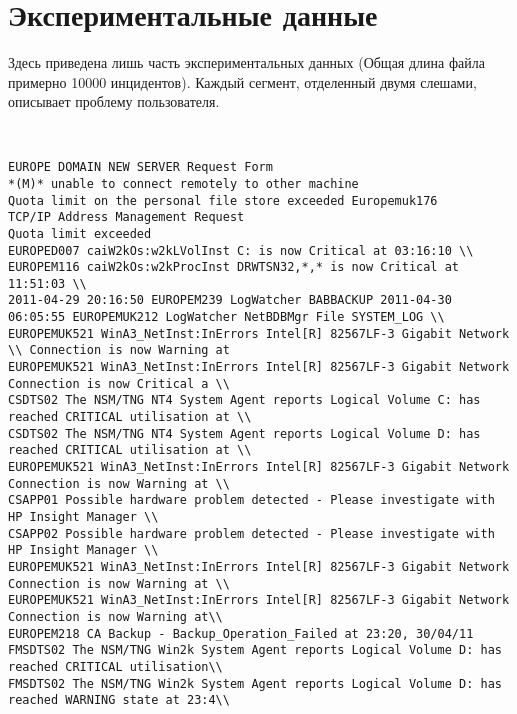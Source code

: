 \chapter{Экспериментальные данные}\label{AppendixE}
Здесь приведена лишь часть экспериментальных данных (Общая длина файла примерно 10000 инцидентов). Каждый сегмент, отделенный двумя слешами, описывает проблему пользователя.
\begin{lstlisting}
	

EUROPE DOMAIN NEW SERVER Request Form
*(M)* unable to connect remotely to other machine 
Quota limit on the personal file store exceeded Europemuk176 
TCP/IP Address Management Request 
Quota limit exceeded 
EUROPED007 caiW2kOs:w2kLVolInst C: is now Critical at 03:16:10 \\
EUROPEM116 caiW2kOs:w2kProcInst DRWTSN32,*,* is now Critical at 11:51:03 \\
2011-04-29 20:16:50 EUROPEM239 LogWatcher BABBACKUP 2011-04-30 06:05:55 EUROPEMUK212 LogWatcher NetBDBMgr File SYSTEM_LOG \\
EUROPEMUK521 WinA3_NetInst:InErrors Intel[R] 82567LF-3 Gigabit Network \\ Connection is now Warning at 
EUROPEMUK521 WinA3_NetInst:InErrors Intel[R] 82567LF-3 Gigabit Network Connection is now Critical a \\
CSDTS02 The NSM/TNG NT4 System Agent reports Logical Volume C: has reached CRITICAL utilisation at \\
CSDTS02 The NSM/TNG NT4 System Agent reports Logical Volume D: has reached CRITICAL utilisation at \\
EUROPEMUK521 WinA3_NetInst:InErrors Intel[R] 82567LF-3 Gigabit Network Connection is now Warning at \\
CSAPP01 Possible hardware problem detected - Please investigate with HP Insight Manager \\
CSAPP02 Possible hardware problem detected - Please investigate with HP Insight Manager \\
EUROPEMUK521 WinA3_NetInst:InErrors Intel[R] 82567LF-3 Gigabit Network Connection is now Warning at \\
EUROPEMUK521 WinA3_NetInst:InErrors Intel[R] 82567LF-3 Gigabit Network Connection is now Warning at\\
EUROPEM218 CA Backup - Backup_Operation_Failed at 23:20, 30/04/11
FMSDTS02 The NSM/TNG Win2k System Agent reports Logical Volume D: has reached CRITICAL utilisation\\
FMSDTS02 The NSM/TNG Win2k System Agent reports Logical Volume D: has reached WARNING state at 23:4\\

\end{lstlisting}

